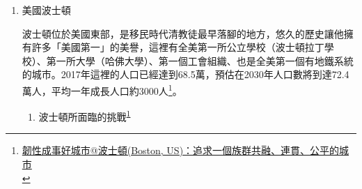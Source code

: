 \documentclass[a4paper,12pt]{article}
\begin{document}
\begin{enumerate}
\item 美國波士頓
\label{sec:org59b76fa}

波士頓位於美國東部，是移民時代清教徒最早落腳的地方，悠久的歷史讓他擁有許多「美國第一」的美譽，這裡有全美第一所公立學校（波士頓拉丁學校）、第一所大學（哈佛大學）、第一個工會組織、也是全美第一個有地鐵系統的城市。2017年這裡的人口已經達到68.5萬，預估在2030年人口數將到達72.4萬人，平均一年成長人口約3000人\footnote{\href{https://eyesonplace.net/2018/12/28/10053/}{韌性成事好城市@波士頓(Boston, US)：追求一個族群共融、連貫、公平的城市}\\\label{orge799f0f}}。\\

\begin{enumerate}
\item 波士頓所面臨的挑戰\textsuperscript{\ref{orge799f0f}}
\label{sec:org897b77b}


\end{enumerate}
\end{enumerate}
\end{document}
